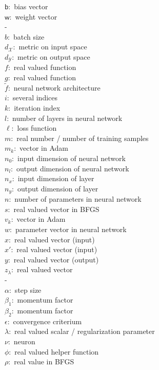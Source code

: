 \documentclass[11pt, a4paper]{article}
\newcommand{\X}{\mathcal{X}}
\newcommand{\Y}{\mathcal{Y}}
\renewcommand{\b}{\mathsf{b}}
\newcommand{\w}{\mathsf{w}}
\begin{document}
\pagebreak
$\b:$ bias vector \\
$\w:$ weight vector \\
- \\
$b:$ batch size \\
$d_{\X}:$ metric on input space \\
$d_{\Y}:$ metric on output space \\
$f:$ real valued function \\
$g:$ real valued function \\
$\tilde{f}:$ neural network architecture \\
$i:$ several indices \\
$k:$ iteration index \\
$l:$ number of layers in neural network \\
$\ell:$ loss function \\
$m:$ real number / number of training samples \\
$m_k:$ vector in Adam \\
$n_0:$ input dimension of neural network \\
$n_l:$ output dimension of neural network \\
$n_x:$ input dimension of layer \\
$n_y:$ output dimension of layer \\
$n:$ number of parameters in neural network \\
$s:$ real valued vector in BFGS \\
$v_k:$ vector in Adam \\
$w:$ parameter vector in neural network \\
$x:$ real valued vector (input) \\
$x':$ real valued vector (input) \\
$y:$ real valued vector (output) \\
$z_{\lambda}:$ real valued vector \\
- \\
$\alpha:$ step size \\
$\beta_1:$ momentum factor \\
$\beta_2:$ momentum factor \\
$\epsilon:$ convergence criterium \\
$\lambda:$ real valued scalar / regularization parameter \\
$\nu:$ neuron \\
$\phi:$ real valued helper function \\
$\rho:$ real value in BFGS\\
\end{document}
